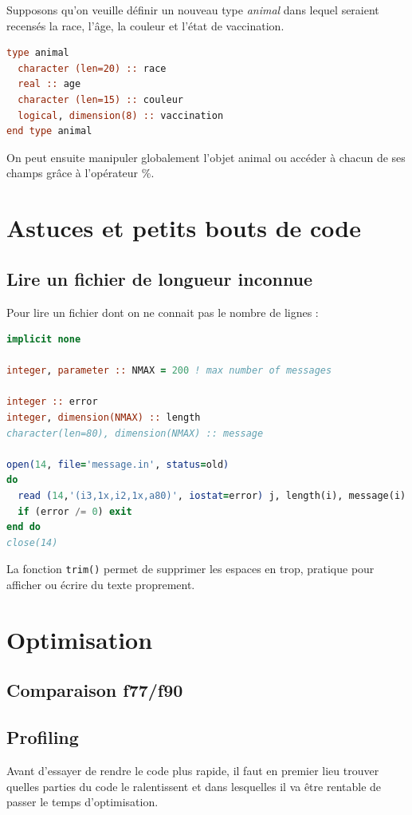 \documentclass[a4paper,twoside]{article}
\begin{document}
\bigskip

\begin{exemple}
Supposons qu'on veuille définir un nouveau type \textit{animal} dans lequel seraient recensés la race, l'âge, la couleur et l'état de vaccination.
\begin{lstlisting}[language=Fortran]
type animal
  character (len=20) :: race
  real :: age
  character (len=15) :: couleur
  logical, dimension(8) :: vaccination
end type animal
\end{lstlisting}

On peut ensuite manipuler globalement l'objet animal ou accéder à chacun de ses champs grâce à l'opérateur \og \%\fg.

\end{exemple}

\section{Astuces et petits bouts de code}
\subsection{Lire un fichier de longueur inconnue}
Pour lire un fichier dont on ne connait pas le nombre de lignes : 
\begin{lstlisting}[language=Fortran]
implicit none

integer, parameter :: NMAX = 200 ! max number of messages

integer :: error
integer, dimension(NMAX) :: length
character(len=80), dimension(NMAX) :: message

open(14, file='message.in', status=old)
do
  read (14,'(i3,1x,i2,1x,a80)', iostat=error) j, length(i), message(i)
  if (error /= 0) exit
end do
close(14)
\end{lstlisting}

\begin{remarque}
La fonction \texttt{trim()} permet de supprimer les espaces en trop, pratique pour afficher ou écrire du texte proprement.
\end{remarque}

\section{Optimisation}
\subsection{Comparaison f77/f90}
\subsection{Profiling}
Avant d'essayer de rendre le code plus rapide, il faut en premier lieu trouver quelles parties du code le ralentissent et dans lesquelles il va être rentable de passer le temps d'optimisation.
\end{document}
